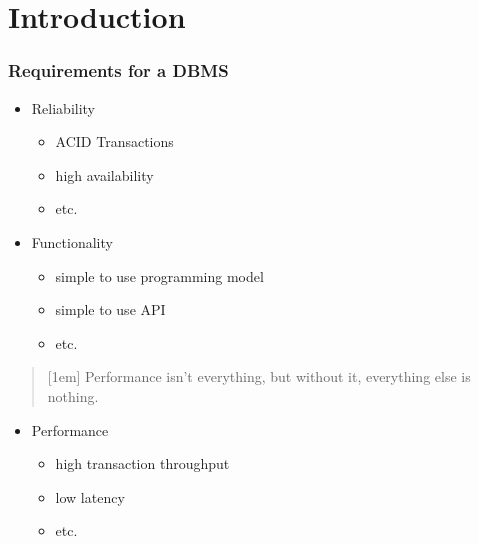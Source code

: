 \section[Introduction]{Introduction} \label{sec_intro}

\begin{frame}
	\sectionpage
\end{frame}

\begin{frame}
	
    \frametitle{Requirements for a DBMS}
    
    \begin{itemize}
    	\item Reliability
              \begin{itemize}
                  \item ACID Transactions
                  \item high availability
                  \item etc.
              \end{itemize}
        \item Functionality
              \begin{itemize}
                  \item simple to use programming model
                  \item simple to use API
                  \item etc.
              \end{itemize}
    \end{itemize}
    
    \begin{quote}[1em]
       	\small Performance isn't everything, but without it, everything else is nothing.
    \end{quote}
    
    \begin{itemize}
    	\item Performance
        	  \begin{itemize}
        	          \item high transaction throughput
                  \item low latency
                  \item etc.
        	  \end{itemize}
    \end{itemize}
    
\end{frame}

